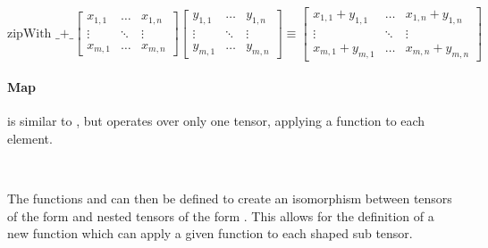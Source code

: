 \begin{displaymath}
  \text{zipWith  \_+\_}
  \begin{bmatrix}
    x_{1,1} & \dots  & x_{1,n} \\
    \vdots  & \ddots & \vdots \\
    x_{m,1} & \dots  & x_{m,n}
  \end{bmatrix}
  \begin{bmatrix}
    y_{1,1} & \dots  & y_{1,n} \\
    \vdots  & \ddots & \vdots \\
    y_{m,1} & \dots  & y_{m,n}
  \end{bmatrix}
  \equiv 
  \begin{bmatrix}
    x_{1,1} + y_{1,1} & \dots  & x_{1,n} + y_{1,n} \\
    \vdots                  & \ddots & \vdots \\
    x_{m,1} + y_{m,1} & \dots  & x_{m,n} + y_{m,n}
  \end{bmatrix}
\end{displaymath}


\paragraph{Map} is similar to , but operates over only one tensor, 
applying a function  to each element.
\begin{code}%
%
\>[2]\AgdaSpace{}%
\AgdaSymbol{:}\AgdaSpace{}%
\AgdaSymbol{(}\AgdaSpace{}%
\AgdaSymbol{:}\AgdaSpace{}%
\AgdaSpace{}%
\AgdaSpace{}%
\AgdaSymbol{)}\AgdaSpace{}%
\AgdaSpace{}%
\AgdaSpace{}%
\AgdaSpace{}%
\AgdaSpace{}%
\AgdaSpace{}%
\AgdaSpace{}%
\AgdaSpace{}%
\<%
\\
%
\>[2]\AgdaSpace{}%
\AgdaSpace{}%
\AgdaSpace{}%
\AgdaSpace{}%
\AgdaSymbol{=}\AgdaSpace{}%
\AgdaSpace{}%
\AgdaSymbol{(}\AgdaSpace{}%
\AgdaSymbol{)}\<%
\end{code}
The functions  and  can then be defined to create an 
isomorphism between tensors of the form  and nested tensors 
of the form .
This allows for the definition of a new function  which can apply a
given function to each  shaped sub tensor.

